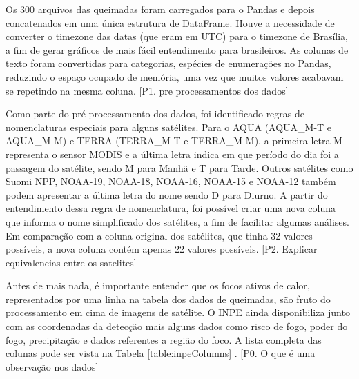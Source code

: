 \documentclass[cic,tc]{iiufrgs}
\begin{document}
Os 300 arquivos das queimadas foram carregados para o Pandas e depois concatenados
em uma única estrutura de DataFrame. Houve a necessidade de converter o timezone 
das datas (que eram em UTC) para o timezone de Brasília, a fim de gerar gráficos 
de mais fácil entendimento para brasileiros. As colunas de texto foram convertidas 
para categorias, espécies de enumerações no Pandas, reduzindo o espaço ocupado 
de memória, uma vez que muitos valores acabavam se repetindo na mesma coluna. 
[P1. pre processamentos dos dados]\par

Como parte do pré-processamento dos dados, foi identificado regras de nomenclaturas 
especiais para alguns satélites. Para o AQUA (AQUA\_M-T e AQUA\_M-M) e TERRA 
(TERRA\_M-T e TERRA\_M-M), a primeira letra M representa o sensor MODIS e a última
letra indica em que período do dia foi a passagem do satélite, sendo M para Manhã 
e T para Tarde. Outros satélites como Suomi NPP, NOAA-19, NOAA-18, NOAA-16, NOAA-15 
e NOAA-12 também podem apresentar a última letra do nome sendo D para Diurno.
A partir do entendimento dessa regra de nomenclatura, foi possível criar uma nova 
coluna que informa o nome simplificado dos satélites, a fim de facilitar 
algumas análises. Em comparação com a coluna original dos satélites, que tinha 32 
valores possíveis, a nova coluna contém apenas 22 valores possíveis.
[P2. Explicar equivalencias entre os satelites] \par


Antes de mais nada, é importante entender que os focos ativos de calor, 
representados por uma linha na tabela dos dados de queimadas, são fruto do 
processamento em cima de imagens de satélite. O INPE ainda 
disponibiliza junto com as coordenadas da detecção mais alguns dados como 
risco de fogo, poder do fogo, precipitação e dados referentes a região do foco. 
A lista completa das colunas pode ser vista na Tabela \ref{table:inpeColumns}
 \cite{PerguntasFrequentesINPE}.
[P0. O que é uma observação nos dados] \par
\end{document}
